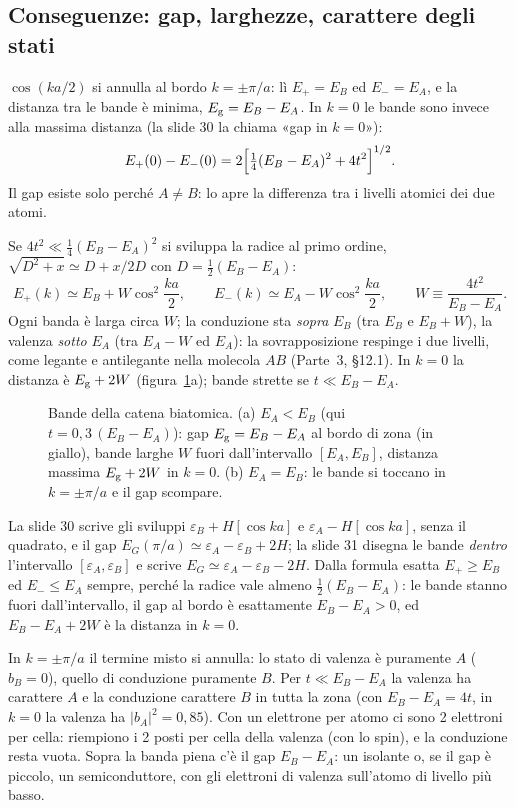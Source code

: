 \documentclass[11pt,a4paper]{article}
\begin{document}
\subsection{Conseguenze: gap, larghezze, carattere degli stati}
$\cos(ka/2)$ si annulla al bordo $k=\pm\pi/a$: lì $E_+=E_B$ ed $E_-=E_A$, e la distanza tra le bande è minima, $E_{\mathrm g}=E_B-E_A$. In $k=0$ le bande sono
invece alla massima distanza (la slide 30 la chiama «gap in $k=0$»):
\[
E_+(0)-E_-(0)=2\Bigl[\tfrac14(E_B-E_A)^2+4t^2\Bigr]^{1/2}.
\]
Il gap esiste solo perché $A\ne B$: lo apre la differenza tra i livelli atomici dei due atomi.

Se $4t^2\ll\frac14(E_B-E_A)^2$ si sviluppa la radice al primo ordine, $\sqrt{D^2+x}\simeq D+x/2D$ con $D=\frac12(E_B-E_A)$:
\[
E_+(k)\simeq E_B+W\cos^2\frac{ka}2,\qquad E_-(k)\simeq E_A-W\cos^2\frac{ka}2,\qquad W\equiv\frac{4t^2}{E_B-E_A}.
\]
Ogni banda è larga circa $W$; la conduzione sta \emph{sopra} $E_B$ (tra $E_B$ e $E_B+W$), la valenza \emph{sotto} $E_A$ (tra $E_A-W$ ed $E_A$): la
sovrapposizione respinge i due livelli, come legante e antilegante nella molecola $AB$ (Parte~3, §12.1). In $k=0$ la distanza è $E_{\mathrm g}+2W$
(figura~\ref{fig:biat}a); bande strette se $t\ll E_B-E_A$.

\begin{figure}[tbp]
\centering
{}
\caption{Bande della catena biatomica. (a) $E_A<E_B$ (qui $t=0{,}3\,(E_B-E_A)$): gap $E_{\mathrm g}=E_B-E_A$ al bordo di zona (in giallo), bande larghe $W$
fuori dall'intervallo $[E_A,E_B]$, distanza massima $E_{\mathrm g}+2W$ in $k=0$. (b) $E_A=E_B$: le bande si toccano in $k=\pm\pi/a$ e il gap scompare.}\label{fig:biat}
\end{figure}

\begin{osservazione}
La slide 30 scrive gli sviluppi $\varepsilon_B+H[\cos ka]$ e $\varepsilon_A-H[\cos ka]$, senza il quadrato, e il gap $E_G(\pi/a)\simeq\varepsilon_A
-\varepsilon_B+2H$; la slide 31 disegna le bande \emph{dentro} l'intervallo $[\varepsilon_A,\varepsilon_B]$ e scrive $E_G\simeq\varepsilon_A-
\varepsilon_B-2H$. Dalla formula esatta $E_+\ge E_B$ ed $E_-\le E_A$ sempre, perché la radice vale almeno $\frac12(E_B-E_A)$: le bande stanno fuori
dall'intervallo, il gap al bordo è esattamente $E_B-E_A>0$, ed $E_B-E_A+2W$ è la distanza in $k=0$.
\end{osservazione}

In $k=\pm\pi/a$ il termine misto si annulla: lo stato di valenza è puramente $A$ ($b_B=0$), quello di conduzione puramente $B$. Per $t\ll E_B-E_A$ la
valenza ha carattere $A$ e la conduzione carattere $B$ in tutta la zona (con $E_B-E_A=4t$, in $k=0$ la valenza ha $|b_A|^2=0{,}85$). Con un elettrone
per atomo ci sono 2 elettroni per cella: riempiono i 2 posti per cella della valenza (con lo spin), e la conduzione resta vuota. Sopra la banda piena
c'è il gap $E_B-E_A$: un isolante o, se il gap è piccolo, un semiconduttore, con gli elettroni di valenza sull'atomo di livello più basso.
\end{document}
